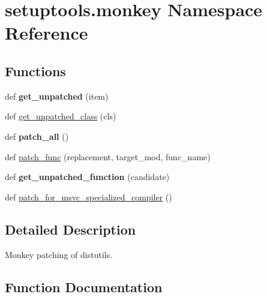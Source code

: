 \hypertarget{namespacesetuptools_1_1monkey}{}\section{setuptools.\+monkey Namespace Reference}
\label{namespacesetuptools_1_1monkey}
\subsection*{Functions}
\begin{DoxyCompactItemize}
\item 
\mbox{\label{namespacesetuptools_1_1monkey_aca0a412fd577e44c2a0d0847019103db}} 
def {\bfseries get\+\_\+unpatched} (item)
\item 
def \hyperlink{namespacesetuptools_1_1monkey_ad46b685f3cc7245cde194b4b7831b38a}{get\+\_\+unpatched\+\_\+class} (cls)
\item 
\mbox{\label{namespacesetuptools_1_1monkey_a593eccd6bead483dc9479ed13d1c4f16}} 
def {\bfseries patch\+\_\+all} ()
\item 
def \hyperlink{namespacesetuptools_1_1monkey_ac6c1bb45a1d90ebcaf099ada0682616b}{patch\+\_\+func} (replacement, target\+\_\+mod, func\+\_\+name)
\item 
\mbox{\label{namespacesetuptools_1_1monkey_a394451d3a77b5f2ff32bc108d7b677d4}} 
def {\bfseries get\+\_\+unpatched\+\_\+function} (candidate)
\item 
def \hyperlink{namespacesetuptools_1_1monkey_a496bc1769e481213444b1d53185b1b89}{patch\+\_\+for\+\_\+msvc\+\_\+specialized\+\_\+compiler} ()
\end{DoxyCompactItemize}


\subsection{Detailed Description}
\begin{DoxyVerb}Monkey patching of distutils.
\end{DoxyVerb}
 

\subsection{Function Documentation}
\mbox{\label{namespacesetuptools_1_1monkey_ad46b685f3cc7245cde194b4b7831b38a}} 
